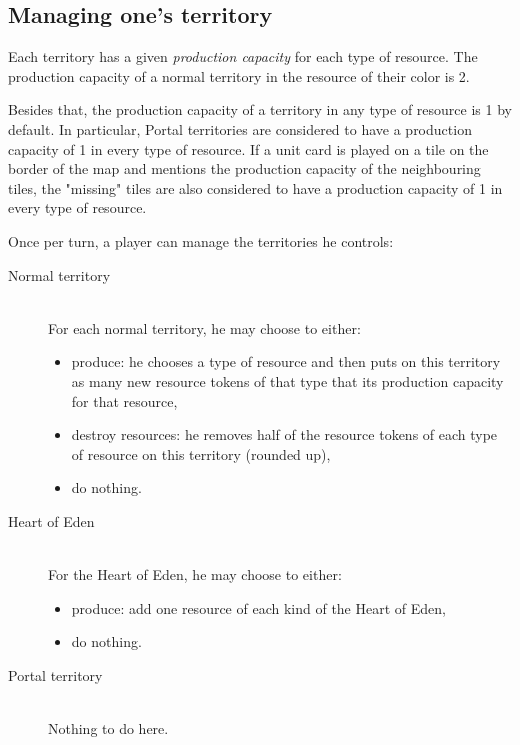 \documentclass[a4paper]{article}
\begin{document}
\newpage
  \subsection{Managing one's territory}
  
    Each territory has a given \textit{production capacity} for each type of resource.
    The production capacity of a normal territory in the resource of their color is 2.
    
    Besides that, the production capacity of a territory in any type of resource is 1 by default.
    In particular, Portal territories are considered to have a production capacity of 1 in every
    type of resource.
    If a unit card is played on a tile on the border of the map and mentions the production
    capacity of the neighbouring tiles, the "missing" tiles are also considered to have a
    production capacity of 1 in every type of resource.
    
    \hspace{-1.5em}Once per turn, a player can manage the territories he controls:
    \vspace{-1.3em}
    \begin{description}
        \item[Normal territory] \hfill \\
        	For each normal territory, he may choose to either:
            \vspace{-0.7em}
            \begin{itemize}
        		\item produce: he chooses a type of resource and then puts
            	on this territory as many new resource tokens of that type that its production
            	capacity for that resource,
        		\item destroy resources: he removes half of the resource
            tokens of each type of resource on this territory (rounded up),
        		\item do nothing.
    		\end{itemize}
        \item[Heart of Eden] \hfill \\
        	For the Heart of Eden, he may choose to either:
            \vspace{-0.7em}
            \begin{itemize}
        		\item produce: add one resource of each kind of the Heart of Eden,
        		\item do nothing.
    		\end{itemize}
        \item[Portal territory] \hfill \\
        	Nothing to do here.
    \end{description}
\end{document}
